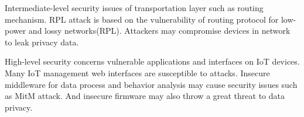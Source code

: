 Intermediate-level security issues of transportation layer such as routing mechanism. RPL attack is based on the vulnerability of routing protocol for low-power and lossy networks(RPL)\cite{dvir2011vera}. Attackers may compromise devices in network to leak privacy data.

High-level security concerns vulnerable applications and interfaces on IoT devices. Many IoT management web interfaces are susceptible to attacks\cite{owasp2016url}. Insecure middleware for data process and behavior analysis may cause security issues such as MitM attack\cite{conzon2012virtus,levy2015ownership}. And insecure firmware may also throw a great threat to data privacy\cite{owasp2016url}.